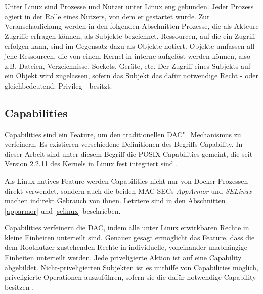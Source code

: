 \documentclass[../main.tex]{subfiles}
\begin{document}
		Unter Linux sind Prozesse und Nutzer unter Linux eng gebunden. Jeder Prozess agiert in der Rolle eines Nutzers, von dem er gestartet wurde.	Zur Veranschaulichung werden in den folgenden Abschnitten Prozesse, die als Akteure Zugriffe erfragen können, als Subjekte bezeichnet. Ressourcen, auf die ein Zugriff erfolgen kann, sind im Gegensatz dazu als Objekte notiert. Objekte umfassen all jene Ressourcen, die von einem Kernel in interne  aufgelöst werden können, also z.B. Dateien, Verzeichnisse, Sockets, Geräte, etc. Der Zugriff eines Subjekts auf ein Objekt wird zugelassen, sofern das Subjekt das dafür notwendige Recht - oder gleichbedeutend: Privileg - besitzt.



    \subsection{Capabilities}
		\label{capabilities}
			Capabilities sind ein Feature, um den traditionellen DAC"=Mechanismus zu verfeinern. Es existieren verschiedene Definitionen des Begriffs \glqq{}Capability\grqq{}. In dieser Arbeit sind unter diesem Begriff die POSIX-Capabilities gemeint, die seit Version 2.2.11 des Kernels in Linux fest integriert sind \cite[S.42]{SELinuxApparmor}.

			Als Linux-natives Feature werden Capabilities nicht nur von Docker-Prozessen direkt verwendet, sondern auch die beiden \acrshort{MAC-SEC}s \emph{AppArmor} und \emph{SELinux} machen indirekt Gebrauch von ihnen. Letztere sind in den Abschnitten \ref{apparmor} und \ref{selinux} beschrieben.

			Capabilities verfeinern die DAC, indem alle unter Linux erwirkbaren Rechte in kleine Einheiten unterteilt sind. Genauer gesagt ermöglicht das Feature, dass die dem Rootnutzer zustehenden Rechte in individuelle, voneinander unabhängige Einheiten unterteilt werden. Jede priveligierte Aktion ist auf eine Capability abgebildet. Nicht-priveligierten Subjekten ist es mithilfe von Capabilities möglich, priveligierte Operationen auszuführen, sofern sie die dafür notwendige Capability besitzen \cite[S.33]{linuxInterface}\cite[S.39]{SELinuxApparmor}.
\end{document}
